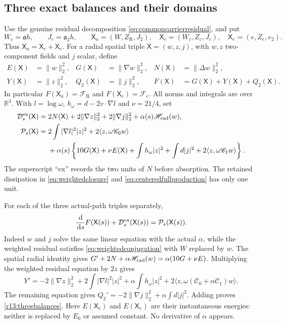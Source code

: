 \documentclass[11pt]{article}
\numberwithin{equation}{section}
\newcommand{\dd}{\,\mathrm d}
\newcommand{\R}{\mathbb R}
\begin{document}
\subsection{Three exact balances and their domains}

Use the genuine residual decomposition
\eqref{eq:commoncarrierresidual}, and put
\[
 W_c=\mathfrak ah,\qquad J_c=\mathfrak a_2h,\qquad
 \mathsf X_a=(W,Z_{\mathrm R},J_2),\quad
 \mathsf X_c=(W_c,Z_c,J_c),\quad
 \mathsf X_e=(e,Z_e,e_2).
\]
Thus $\mathsf X_a=\mathsf X_c+\mathsf X_e$. For a radial spatial triple
$\mathsf X=(w,z,j)$, with $w,z$ two-component fields and $j$ scalar,
define
\begin{align}
 E(\mathsf X)&=\|w\|_2^2,&G(\mathsf X)&=\|\nabla w\|_2^2,&
 N(\mathsf X)&=\|\Delta w\|_2^2,\nonumber\\
 Y(\mathsf X)&=\|z\|_2^2,&Q_2(\mathsf X)&=\|j\|_2^2,&
 F(\mathsf X)&=G(\mathsf X)+Y(\mathsf X)+Q_2(\mathsf X).
 \label{r13:triplenorms}
\end{align}
In particular $F(\mathsf X_a)=\mathcal F_{\mathrm R}$ and
$F(\mathsf X_e)=\mathcal F_e$. All norms and integrals are over
$\R^3$. With $l=\log\omega$, $h_\omega=d-2v\cdot\nabla l$ and
$\nu=21/4$, set
\begin{align}
 \mathcal D^{\rm ex}_s(\mathsf X)
  ={}&2N(\mathsf X)+2\|\nabla z\|_2^2+2\|\nabla j\|_2^2
                   +\alpha(s)\mathscr H_{\rm rad}(w),
 \label{r13:exactdissipation}\\
 \mathcal P_s(\mathsf X)
  ={}&2\int|\nabla l|^2|z|^2
          +2\langle z,\omega\mathscr C_0w\rangle\nonumber\\
 &+\alpha(s)\left\{10G(\mathsf X)+\nu E(\mathsf X)
       +\int h_\omega|z|^2+\int d|j|^2
                 +2\langle z,\omega\mathscr C_1w\rangle\right\}.
 \label{r13:exactproduction}
\end{align}
The superscript ``ex'' records the two units of $N$ before absorption.
The retained dissipation in \eqref{eq:weightedclosure} and
\eqref{eq:centeredfullproduction} has only one unit.

For each of the three actual-path triples separately,
\begin{equation}\label{r13:threebalances}
 \frac{\dd}{\dd s}F(\mathsf X(s))
       +\mathcal D^{\rm ex}_s(\mathsf X(s))
       =\mathcal P_s(\mathsf X(s)).
\end{equation}
Indeed $w$ and $j$ solve the same linear equation with the actual
$\alpha$, while the weighted residual satisfies
\eqref{eq:weightedconjugation} with $W$ replaced by $w$.
The spatial radial identity gives
$G'+2N+\alpha\mathscr H_{\rm rad}(w)=\alpha(10G+\nu E)$.
Multiplying the weighted residual equation by $2z$ gives
\[
 Y'=-2\|\nabla z\|_2^2+2\int|\nabla l|^2|z|^2
    +\alpha\int h_\omega|z|^2
    +2\langle z,\omega(\mathscr C_0+\alpha\mathscr C_1)w\rangle.
\]
The remaining equation gives
$Q_2'=-2\|\nabla j\|_2^2+\alpha\int d|j|^2$.
Adding proves \eqref{r13:threebalances}. Here $E(\mathsf X_c)$ and
$E(\mathsf X_e)$ are their instantaneous energies: neither is replaced
by $E_0$ or assumed constant. No derivative of $\alpha$ appears.
\end{document}
